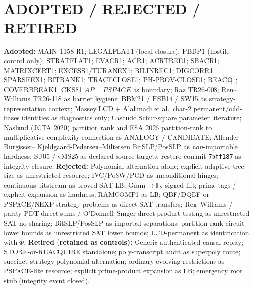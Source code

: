 \documentclass[11pt]{article}
\begin{document}
\section*{ADOPTED / REJECTED / RETIRED}
\textbf{Adopted:} MAIN~1158-R1; LEGALFLAT1 (local closure); PBDP1 (hostile control only);
STRATFLAT1; EVACR1; ACR1; ACRTREE1; SBACR1; MATRIXCERT1; EXCESS1/TURANEX1; BILINREC1;
DIGCORR1; SPARSEEX1; BITRANK1; TRACECLOSE1; PH-PROV-CLOSE1; REACQ1; COVERBREAK1;
CKS81 $AP=PSPACE$ as boundary; Raz TR26-008; Ren--Williams TR26-118 as barrier hygiene;
BBM21 / HSB14 / SW15 as strategy-representation context; Massey LCD + Alahmadi et al.\
char-$2$ permanent/odd-bases identities as diagnostics only; Cascudo Schur-square
parameter literature; Naslund (JCTA 2020) partition rank and ESA 2026 partition-rank
to multiplicative-complexity connection as ANALOGY / CANDIDATE; Allender--B\"urgisser--
Kjeldgaard-Pedersen--Miltersen BitSLP/PosSLP as \emph{non}-importable hardness;
SU05 / vMS25 as declared source targets; restore commit \texttt{7bff187} as integrity
closure.
\textbf{Rejected:} Polynomial alternation alone; explicit adaptive-tree size as unrestricted
resource; IVC/PoSW/PCD as unconditional hinges; continuous bitstream as proved SAT LB;
Gram$\to\mathbb F_2$ signed-lift; prime tags / explicit expansion as hardness;
RAMCOMP1 as LB; QBF/DQBF or PSPACE/NEXP strategy problems as direct SAT transfers;
Ren--Williams / parity-PDT direct sums / O'Donnell--Singer direct-product testing as
unrestricted SAT no-sharing; BitSLP/PosSLP as imported separations; partition-rank
circuit lower bounds as unrestricted SAT lower bounds; LCD-permanent as identification
with $\Phi$.
\textbf{Retired (retained as controls):} Generic authenticated causal replay; STORE-or-REACQUIRE
standalone; poly-transcript audit as superpoly route; succinct-strategy polynomial
alternation; ordinary evolving restrictions as PSPACE-like resource; explicit prime-product
expansion as LB; emergency root stub (integrity event closed).
\end{document}
